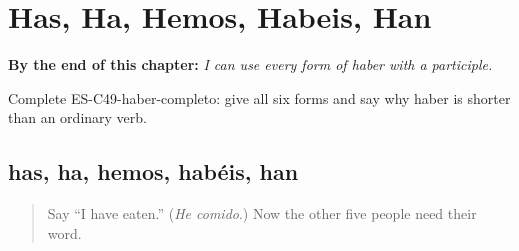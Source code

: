 
\chapter{Has, Ha, Hemos, Habeis, Han}
\label{ch:perfect-complete}

\begin{chapteropening}
\textbf{By the end of this chapter:} \emph{I can use every form of haber with a participle.}

Complete ES-C49-haber-completo: give all six forms and say why haber is shorter than an ordinary verb.
\end{chapteropening}

\section[has · ha · hemos · habéis · han]{has, ha, hemos, habéis, han}

\label{lesson:ES-C49-haber-completo}



\begin{quote}
Say \textquotedblleft{}I have eaten.\textquotedblright{} (\emph{He comido}.) Now the other five people need their word.
\end{quote}

